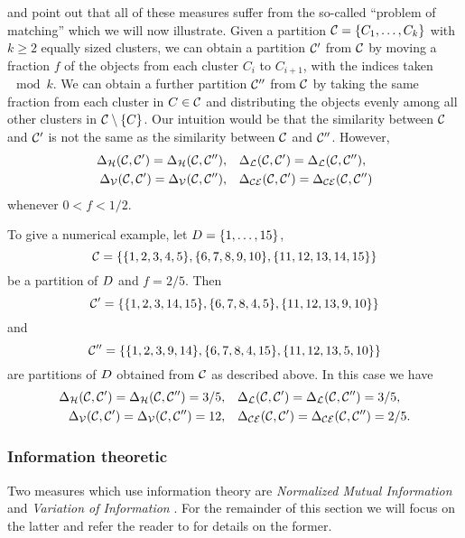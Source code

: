 \citet{meila-2007} and \citet{bae2010comparison} point out that all of these
measures suffer from the so-called ``problem of matching'' which we will now
illustrate.  Given a partition $\mathcal{C}=\{C_1,\dotsc,C_k\}$ with $k\geq 2$
equally sized clusters, we can obtain a partition $\mathcal{C}'$ from $\mathcal{C}$ by
moving a fraction $f$ of the objects from each cluster $C_{i}$ to $C_{i+1}$,
with the indices taken$\mod k$.  We can obtain a further partition $\mathcal{C}''$
from $\mathcal{C}$ by taking the same fraction from each cluster in $C \in \mathcal{C}$
and distributing the objects evenly among all other clusters in $\mathcal{C}
\setminus \{C\}$.  Our intuition would be that the similarity between $\mathcal{C}$
and $\mathcal{C}'$ is not the same as the similarity between $\mathcal{C}$ and $\mathcal{C}''$.
However,
\begin{align*}
  \Delta_{\mathcal{H}}(\mathcal{C},\mathcal{C}') = \Delta_{\mathcal{H}}(\mathcal{C},\mathcal{C}''),&\quad
  \Delta_{\mathcal{L}}(\mathcal{C},\mathcal{C}') = \Delta_{\mathcal{L}}(\mathcal{C},\mathcal{C}''),\\
  \Delta_{\mathcal{V}}(\mathcal{C},\mathcal{C}') = \Delta_{\mathcal{V}}(\mathcal{C},\mathcal{C}''),&\quad
  \Delta_{\mathcal{CE}}(\mathcal{C},\mathcal{C}') = \Delta_{\mathcal{CE}}(\mathcal{C},\mathcal{C}'')
\end{align*}
whenever $0< f < 1/2$.

To give a numerical example, let $D = \{1,\dotsc,15\}$,
\begin{equation*}
  \mathcal{C} = \{\{1,2,3,4,5\},\{6,7,8,9,10\},\{11,12,13,14,15\}\}
\end{equation*}
be a partition of $D$ and $f = 2/5$.  Then
\begin{equation*}
\mathcal{C}' = \{\{1,2,3,14,15\},\{6,7,8,4,5\},\{11,12,13,9,10\}\}
\end{equation*}
and
\begin{equation*}
\mathcal{C}'' = \{\{1,2,3,9,14\},\{6,7,8,4,15\},\{11,12,13,5,10\}\}
\end{equation*}
are partitions of $D$ obtained from $\mathcal{C}$ as described above.  In this
case we have
\begin{align*}
  \Delta_{\mathcal{H}}(\mathcal{C},\mathcal{C}') = \Delta_{\mathcal{H}}(\mathcal{C},\mathcal{C}'') = 3/5,&\quad
  \Delta_{\mathcal{L}}(\mathcal{C},\mathcal{C}') = \Delta_{\mathcal{L}}(\mathcal{C},\mathcal{C}'') = 3/5,\\
  \Delta_{\mathcal{V}}(\mathcal{C},\mathcal{C}') = \Delta_{\mathcal{V}}(\mathcal{C},\mathcal{C}'') = 12,&\quad
  \Delta_{\mathcal{CE}}(\mathcal{C},\mathcal{C}') = \Delta_{\mathcal{CE}}(\mathcal{C},\mathcal{C}'') = 2/5.
\end{align*}

\subsubsection{Information theoretic}
\label{sec:inform-theor}

Two measures which use information theory are \textit{Normalized Mutual
  Information} \citep{fred-jain-2003} and \textit{Variation of Information}
\citep{meila-2007}.  For the remainder of this section we will focus on the
latter and refer the reader to \citep{fred-jain-2003} for details on the
former.

